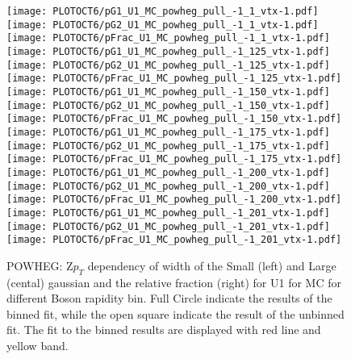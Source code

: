 \documentclass[41pt,a4paper,oneside]{report}
\begin{document}
\begin{figure}[h!]
  \begin{center}
    \texttt{[image: PLOTOCT6/pG1\_U1\_MC\_powheg\_pull\_-1\_1\_vtx-1.pdf]}
    \texttt{[image: PLOTOCT6/pG2\_U1\_MC\_powheg\_pull\_-1\_1\_vtx-1.pdf]}
    \texttt{[image: PLOTOCT6/pFrac\_U1\_MC\_powheg\_pull\_-1\_1\_vtx-1.pdf]} 
    \texttt{[image: PLOTOCT6/pG1\_U1\_MC\_powheg\_pull\_-1\_125\_vtx-1.pdf]}
    \texttt{[image: PLOTOCT6/pG2\_U1\_MC\_powheg\_pull\_-1\_125\_vtx-1.pdf]}
    \texttt{[image: PLOTOCT6/pFrac\_U1\_MC\_powheg\_pull\_-1\_125\_vtx-1.pdf]} 
    \texttt{[image: PLOTOCT6/pG1\_U1\_MC\_powheg\_pull\_-1\_150\_vtx-1.pdf]}
    \texttt{[image: PLOTOCT6/pG2\_U1\_MC\_powheg\_pull\_-1\_150\_vtx-1.pdf]}
    \texttt{[image: PLOTOCT6/pFrac\_U1\_MC\_powheg\_pull\_-1\_150\_vtx-1.pdf]} 
    \texttt{[image: PLOTOCT6/pG1\_U1\_MC\_powheg\_pull\_-1\_175\_vtx-1.pdf]}
    \texttt{[image: PLOTOCT6/pG2\_U1\_MC\_powheg\_pull\_-1\_175\_vtx-1.pdf]}
    \texttt{[image: PLOTOCT6/pFrac\_U1\_MC\_powheg\_pull\_-1\_175\_vtx-1.pdf]} 
    \texttt{[image: PLOTOCT6/pG1\_U1\_MC\_powheg\_pull\_-1\_200\_vtx-1.pdf]}
    \texttt{[image: PLOTOCT6/pG2\_U1\_MC\_powheg\_pull\_-1\_200\_vtx-1.pdf]}
    \texttt{[image: PLOTOCT6/pFrac\_U1\_MC\_powheg\_pull\_-1\_200\_vtx-1.pdf]} 
    \texttt{[image: PLOTOCT6/pG1\_U1\_MC\_powheg\_pull\_-1\_201\_vtx-1.pdf]}
    \texttt{[image: PLOTOCT6/pG2\_U1\_MC\_powheg\_pull\_-1\_201\_vtx-1.pdf]}
    \texttt{[image: PLOTOCT6/pFrac\_U1\_MC\_powheg\_pull\_-1\_201\_vtx-1.pdf]} 
    \caption{POWHEG: Z$p_{T}$ dependency of width of the Small (left) and Large (cental) gaussian and the relative fraction (right) for U1 for MC for different Boson rapidity bin. Full Circle indicate the results of the binned fit, while the open square indicate the result of the unbinned fit. The fit to the binned results are displayed with red line and yellow band.
\newline
}
    \label{fig:SmallLargeU1POW}
  \end{center}
\end{figure}
\end{document}
